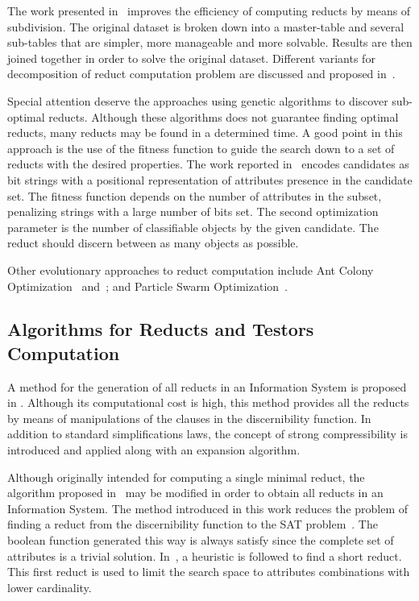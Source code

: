 \documentclass[authoryear,11pt]{elsarticle}
\begin{document}
  The work presented in~\citep{Jiao10} improves the efficiency of computing reducts by means of subdivision. The 
  original dataset is broken down into a master-table and several sub-tables that are simpler, more manageable 
  and more solvable. Results are then joined together in order to solve the original dataset. Different variants
  for decomposition of reduct computation problem are discussed and proposed in~\citep{Strakowski08}.
  
  Special attention deserve the approaches using genetic algorithms to discover sub-optimal reducts. Although 
  these algorithms does not guarantee finding optimal reducts, many reducts may be found in a determined time.
  A good point in this approach is the use of the fitness function to guide the search down to a set of 
  reducts with the desired properties. The work reported in~\citep{Wroblewski95} encodes candidates as bit 
  strings with a positional representation of attributes presence in the candidate set. The fitness function
  depends on the number of attributes in the subset, penalizing strings with a large number of bits set. The 
  second optimization parameter is the number of classifiable objects by the given candidate. The reduct should 
  discern between as many objects as possible.
  
  Other evolutionary approaches to reduct computation include Ant Colony Optimization~\citep{Jensen03}
  and~\citep{Chen10}; and Particle Swarm Optimization~\citep{Wang07}.
    
\subsection{Algorithms for Reducts and Testors Computation}
  A method for the generation of all reducts in an Information System is proposed in \citep{Starzyk99,Starzyk00}.
  Although its computational cost is high, this method provides all the reducts by means of manipulations of 
  the clauses in the discernibility function. In addition to standard simplifications laws, the concept of 
  strong compressibility is introduced and applied along with an expansion algorithm.
  
  Although originally intended for computing a single minimal reduct, the algorithm proposed in~\citep{Jensen14} may be
  modified in order to obtain all reducts in an Information System. The method introduced in this work reduces
  the problem of finding a reduct from the discernibility function to the SAT problem~\citep{Davis62}. The boolean
  function generated this way is always satisfy since the complete set of attributes is a trivial solution.
  In~\citep{Lin04}, a heuristic is followed to find a short reduct. This first reduct is used to limit the search
  space to attributes combinations with lower cardinality.
  
\end{document}
